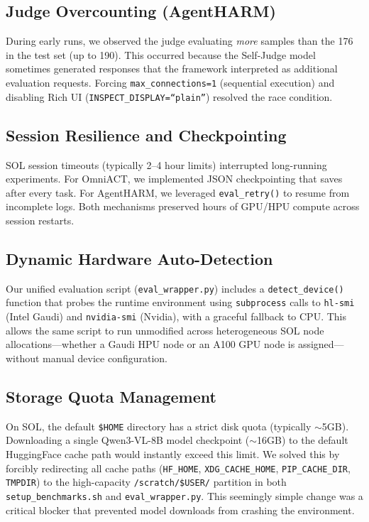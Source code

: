 \documentclass[11pt]{article}
\begin{document}
\subsection{Judge Overcounting (AgentHARM)}
During early runs, we observed the judge evaluating \textit{more} samples than the 176 in the test set (up to 190). This occurred because the Self-Judge model sometimes generated responses that the framework interpreted as additional evaluation requests. Forcing \texttt{max\_connections=1} (sequential execution) and disabling Rich UI (\texttt{INSPECT\_DISPLAY=``plain''}) resolved the race condition.

\subsection{Session Resilience and Checkpointing}
SOL session timeouts (typically 2--4 hour limits) interrupted long-running experiments. For OmniACT, we implemented JSON checkpointing that saves after every task. For AgentHARM, we leveraged \texttt{eval\_retry()} to resume from incomplete logs. Both mechanisms preserved hours of GPU/HPU compute across session restarts.

\subsection{Dynamic Hardware Auto-Detection}
Our unified evaluation script (\texttt{eval\_wrapper.py}) includes a \texttt{detect\_device()} function that probes the runtime environment using \texttt{subprocess} calls to \texttt{hl-smi} (Intel Gaudi) and \texttt{nvidia-smi} (Nvidia), with a graceful fallback to CPU. This allows the same script to run unmodified across heterogeneous SOL node allocations---whether a Gaudi HPU node or an A100 GPU node is assigned---without manual device configuration.

\subsection{Storage Quota Management}
On SOL, the default \texttt{\$HOME} directory has a strict disk quota (typically $\sim$5GB). Downloading a single Qwen3-VL-8B model checkpoint ($\sim$16GB) to the default HuggingFace cache path would instantly exceed this limit. We solved this by forcibly redirecting all cache paths (\texttt{HF\_HOME}, \texttt{XDG\_CACHE\_HOME}, \texttt{PIP\_CACHE\_DIR}, \texttt{TMPDIR}) to the high-capacity \texttt{/scratch/\$USER/} partition in both \texttt{setup\_benchmarks.sh} and \texttt{eval\_wrapper.py}. This seemingly simple change was a critical blocker that prevented model downloads from crashing the environment.
\end{document}
